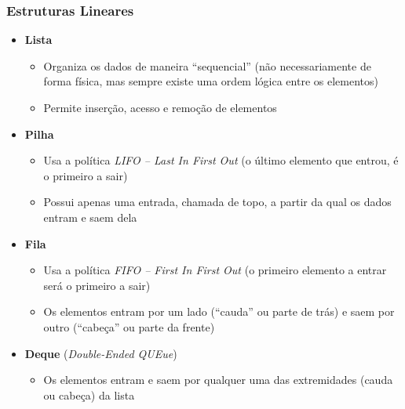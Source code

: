 \documentclass[aspectratio=169]{beamer}
\begin{document}
\begin{frame}\frametitle{Estruturas Lineares}
\begin{itemize}
	\item \textbf{Lista}
	\begin{itemize}
		\item Organiza os dados de maneira ``sequencial'' (não necessariamente de forma física, mas sempre existe uma ordem lógica entre os elementos)
		\item Permite inserção, acesso e remoção de elementos
	\end{itemize}
	\item \textbf{Pilha}
	\begin{itemize}
		\item Usa a política \emph{LIFO -- Last In First Out} (o último elemento que entrou, é o primeiro a sair)
		\item Possui apenas uma entrada, chamada de topo, a partir da qual os dados entram e saem dela
	\end{itemize}
	\item \textbf{Fila}
	\begin{itemize}
		\item Usa a política \emph{FIFO -- First In First Out} (o primeiro elemento a entrar será o primeiro a sair)
		\item Os elementos entram por um lado (``cauda'' ou parte de trás) e saem por outro (``cabeça'' ou parte da frente)
	\end{itemize}
	\item \textbf{Deque} (\emph{Double-Ended QUEue})
	\begin{itemize}
		\item Os elementos entram e saem por qualquer uma das extremidades (cauda ou cabeça) da lista
	\end{itemize}
\end{itemize}
\end{frame}
\end{document}
